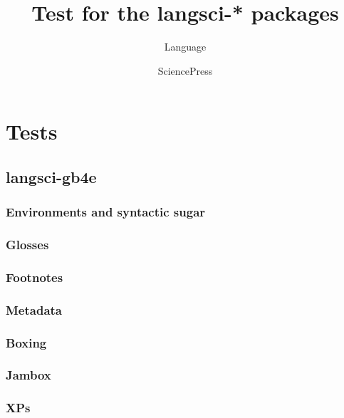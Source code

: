 \documentclass[output=book
	      ,nonflat
	      ,modfonts,
	      ,colorlinks
	      ,biblatex
	      ,showindex
	      ]{langsci/langscibook}
\title{Test for the langsci-* packages}
\author{Language\and Science\lastand Press}
\begin{document}
\maketitle 
\tableofcontents




\chapter{Tests} 
\section{langsci-gb4e}
\subsection{Environments and syntactic sugar}









 
\subsection{Glosses}





 
\subsection{Footnotes}


 
\subsection{Metadata}

\subsection{Boxing}

% 
\subsection{Jambox}

\subsection{XPs}


  
\end{document}
